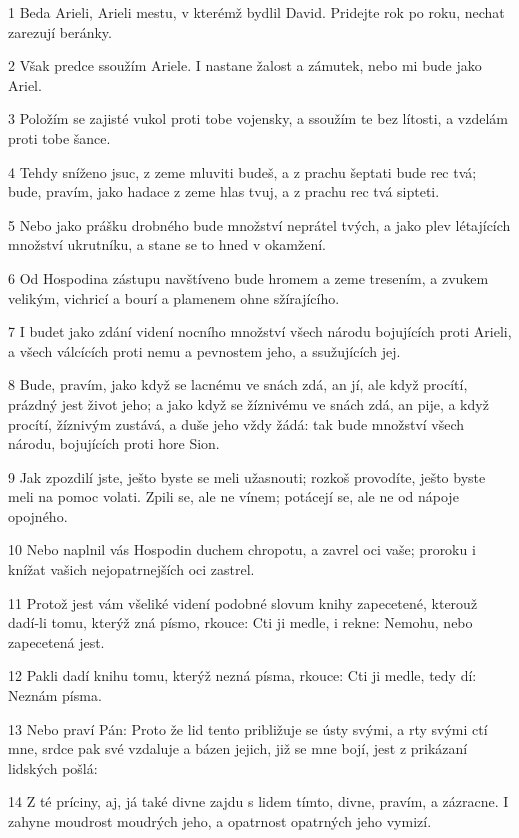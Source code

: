 \par 1 Beda Arieli, Arieli mestu, v kterémž bydlil David. Pridejte rok po roku, nechat zarezují beránky.
\par 2 Však predce ssoužím Ariele. I nastane žalost a zámutek, nebo mi bude jako Ariel.
\par 3 Položím se zajisté vukol proti tobe vojensky, a ssoužím te bez lítosti, a vzdelám proti tobe šance.
\par 4 Tehdy sníženo jsuc, z zeme mluviti budeš, a z prachu šeptati bude rec tvá; bude, pravím, jako hadace z zeme hlas tvuj, a z prachu rec tvá sipteti.
\par 5 Nebo jako prášku drobného bude množství neprátel tvých, a jako plev létajících množství ukrutníku, a stane se to hned v okamžení.
\par 6 Od Hospodina zástupu navštíveno bude hromem a zeme tresením, a zvukem velikým, vichricí a bourí a plamenem ohne sžírajícího.
\par 7 I budet jako zdání videní nocního množství všech národu bojujících proti Arieli, a všech válcících proti nemu a pevnostem jeho, a ssužujících jej.
\par 8 Bude, pravím, jako když se lacnému ve snách zdá, an jí, ale když procítí, prázdný jest život jeho; a jako když se žíznivému ve snách zdá, an pije, a když procítí, žíznivým zustává, a duše jeho vždy žádá: tak bude množství všech národu, bojujících proti hore Sion.
\par 9 Jak zpozdilí jste, ješto byste se meli užasnouti; rozkoš provodíte, ješto byste meli na pomoc volati. Zpili se, ale ne vínem; potácejí se, ale ne od nápoje opojného.
\par 10 Nebo naplnil vás Hospodin duchem chropotu, a zavrel oci vaše; proroku i knížat vašich nejopatrnejších oci zastrel.
\par 11 Protož jest vám všeliké videní podobné slovum knihy zapecetené, kterouž dadí-li tomu, kterýž zná písmo, rkouce: Cti ji medle, i rekne: Nemohu, nebo zapecetená jest.
\par 12 Pakli dadí knihu tomu, kterýž nezná písma, rkouce: Cti ji medle, tedy dí: Neznám písma.
\par 13 Nebo praví Pán: Proto že lid tento približuje se ústy svými, a rty svými ctí mne, srdce pak své vzdaluje a bázen jejich, již se mne bojí, jest z prikázaní lidských pošlá:
\par 14 Z té príciny, aj, já také divne zajdu s lidem tímto, divne, pravím, a zázracne. I zahyne moudrost moudrých jeho, a opatrnost opatrných jeho vymizí.
